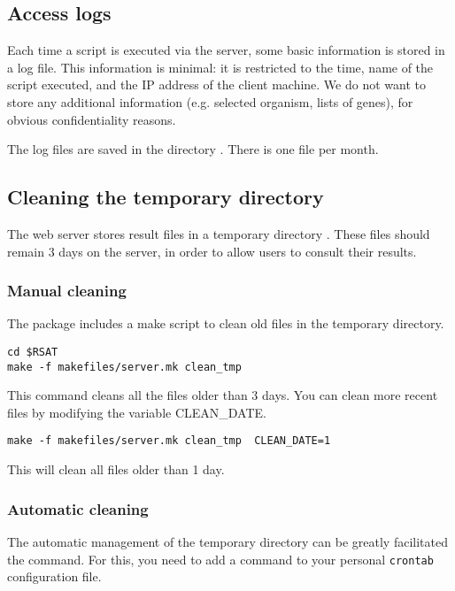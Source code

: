 \documentclass[12pt,a4paper, twoside]{scrreprt} %
\begin{document}
\subsection{Access logs}

Each time a script is executed via the \RSAT server, some basic
information is stored in a log file. This information is minimal: it
is restricted to the time, name of the script executed, and the IP
address of the client machine. We do not want to store any additional
information (e.g. selected organism, lists of genes), for obvious
confidentiality reasons.

The log files are saved in the directory . There
is one file per month.


\subsection{Cleaning the temporary directory}

The web server stores result files in a temporary directory
. These files should remain 3 days on
the server, in order to allow users to consult their results.

\subsubsection{Manual cleaning}

The \RSAT package includes a make script to clean old files in the
temporary directory.

\begin{lstlisting}
cd $RSAT
make -f makefiles/server.mk clean_tmp
\end{lstlisting}

This command cleans all the files older than 3 days. You can clean
more recent files by modifying the variable CLEAN\_DATE.

\begin{lstlisting}
make -f makefiles/server.mk clean_tmp  CLEAN_DATE=1
\end{lstlisting}

This will clean all files older than 1 day.

\subsubsection{Automatic cleaning}

The automatic management of the temporary directory can be greatly
facilitated the  command. For this, you need to add a
command to your personal \texttt{crontab} configuration file.
\end{document}
